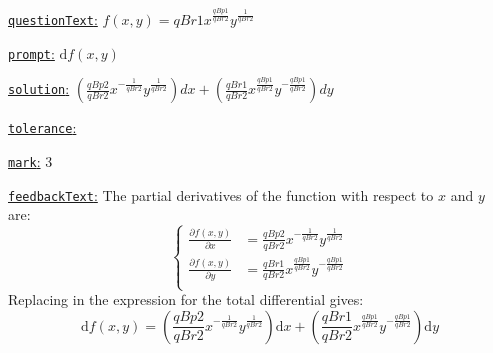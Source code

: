 \documentclass[preview]{standalone}
\newcommand \fieldname[1]{\underline{\texttt{#1}:}}
\begin{document}
\fieldname{questionText}
$f(x,y) = {qBr1}x^{\frac{{qBp1}}{{qBr2}}}y^{\frac{1}{{qBr2}}}$

\fieldname{prompt}
$\textrm{d}f(x,y)$

\fieldname{solution}
$(\frac{{qBp2}}{{qBr2}}x^{-\frac{1}{{qBr2}}}y^{\frac{1}{{qBr2}}})dx + (\frac{{qBr1}}{{qBr2}}x^{\frac{{qBp1}}{{qBr2}}}y^{-\frac{{qBp1}}{{qBr2}}})dy$

\fieldname{tolerance}


\fieldname{mark}
3

\fieldname{feedbackText}
The partial derivatives of the function with respect to $x$ and $y$ are:
\[
\left\{\begin{aligned}
\frac{\partial f(x,y)}{\partial x} & = \frac{{qBp2}}{{qBr2}}x^{-\frac{1}{{qBr2}}}y^{\frac{1}{{qBr2}}}\\
\frac{\partial f(x,y)}{\partial y} & = \frac{{qBr1}}{{qBr2}}x^{\frac{{qBp1}}{{qBr2}}}y^{-\frac{{qBp1}}{{qBr2}}}\\
\end{aligned}\right.
\]
Replacing in the expression for the total differential gives:
\[
\textrm{d}f(x,y) = \left(\frac{{qBp2}}{{qBr2}}x^{-\frac{1}{{qBr2}}}y^{\frac{1}{{qBr2}}}\right)\textrm{d}x + \left(\frac{{qBr1}}{{qBr2}}x^{\frac{{qBp1}}{{qBr2}}}y^{-\frac{{qBp1}}{{qBr2}}}\right)\textrm{d}y
\]

\end{document}

